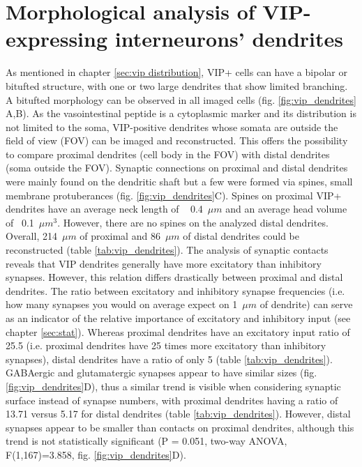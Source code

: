 \section{Morphological analysis of VIP-expressing interneurons' dendrites}
\label{sec:VIP dendrites}
As mentioned in chapter \ref{sec:vip distribution}, VIP+ cells can have a bipolar or bitufted structure, with one or two large dendrites that show limited branching. A bitufted morphology can be observed in all imaged cells (fig. \ref{fig:vip_dendrites} A,B). As the vasointestinal peptide is a cytoplasmic marker and its distribution is not limited to the soma, VIP-positive dendrites whose somata are outside the field of view (FOV) can be imaged and reconstructed. This offers the possibility to compare proximal dendrites (cell body in the FOV) with distal dendrites (soma outside the FOV). Synaptic connections on proximal and distal dendrites were mainly found on the dendritic shaft but a few were formed via spines, small  membrane protuberances (fig. \ref{fig:vip_dendrites}C). Spines on proximal VIP+ dendrites have an average neck length of ~ 0.4~$\mu m$ and an average head volume of ~0.1~$\mu m^3$. However, there are no spines on the analyzed distal dendrites. Overall, 214~$\mu m$ of proximal and 86~$\mu m$ of distal dendrites could be reconstructed (table \ref{tab:vip_dendrites}). The analysis of synaptic contacts reveals that VIP dendrites generally have more excitatory than inhibitory synapses. However, this relation differs drastically between proximal and distal dendrites. The ratio between excitatory and inhibitory synapse frequencies (i.e. how many synapses you would on average expect on 1~$\mu m$ of dendrite) can serve as an indicator of the relative importance of excitatory and inhibitory input (see chapter \ref{sec:stat}). Whereas proximal dendrites have an excitatory input ratio of 25.5 (i.e. proximal dendrites have 25 times more excitatory than inhibitory synapses), distal dendrites have a ratio of only 5 (table \ref{tab:vip_dendrites}). GABAergic and glutamatergic synapses appear to have similar sizes (fig. \ref{fig:vip_dendrites}D), thus a similar trend is visible when considering synaptic surface instead of synapse numbers, with proximal dendrites having a ratio of 13.71 versus 5.17 for distal dendrites (table \ref{tab:vip_dendrites}). However, distal synapses appear to be smaller than contacts on proximal dendrites, although this trend is not statistically significant (P = 0.051, two-way ANOVA, F(1,167)=3.858, fig. \ref{fig:vip_dendrites}D).\\

